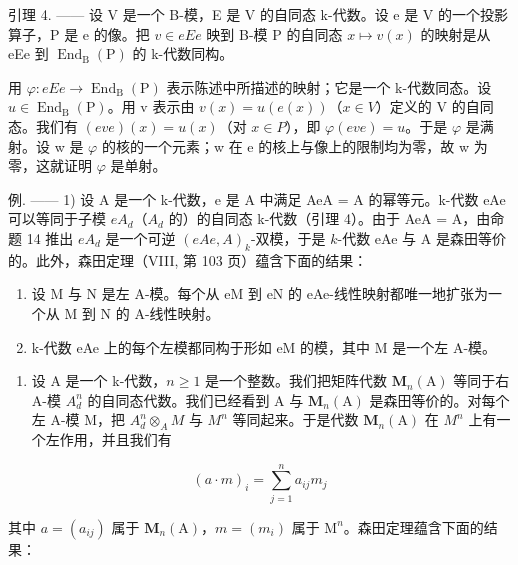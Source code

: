引理 4. —— 设 V 是一个 B-模，E 是 V 的自同态 k-代数。设 e 是 V 的一个投影算子，P 是 e 的像。把 \(v \in eEe\) 映到 B-模 P 的自同态 \(x \mapsto v(x)\) 的映射是从 eEe 到 \(\operatorname{End}_{\mathrm{B}}(\mathrm{P})\) 的 k-代数同构。

用 \(\varphi:eEe\to\operatorname{End}_{\mathrm{B}}(\mathrm{P})\) 表示陈述中所描述的映射；它是一个 k-代数同态。设 \(u\in\operatorname{End}_{\mathrm{B}}(\mathrm{P})\)。用 v 表示由 \(v(x)=u(e(x))\)（\(x\in V\)）定义的 V 的自同态。我们有 \((eve)(x)=u(x)\)（对 \(x\in P\)），即 \(\varphi(eve)=u\)。于是 \(\varphi\) 是满射。设 w 是 \(\varphi\) 的核的一个元素；w 在 e 的核上与像上的限制均为零，故 w 为零，这就证明 \(\varphi\) 是单射。

例. —— 1) 设 A 是一个 k-代数，e 是 A 中满足 AeA = A 的幂等元。k-代数 eAe 可以等同于子模 \(eA_{d}\)（\(A_{d}\) 的）的自同态 k-代数（引理 4）。由于 AeA = A，由命题 14 推出 \(eA_{d}\) 是一个可逆 \((eAe, A)_{k}\)-双模，于是 \(k\)-代数 eAe 与 A 是森田等价的。此外，森田定理（VIII, 第 103 页）蕴含下面的结果：

\begin{enumerate}
\def\labelenumi{\alph{enumi})}
\item
  设 M 与 N 是左 A-模。每个从 eM 到 eN 的 eAe-线性映射都唯一地扩张为一个从 M 到 N 的 A-线性映射。
\item
  k-代数 eAe 上的每个左模都同构于形如 eM 的模，其中 M 是一个左 A-模。
\end{enumerate}

\begin{enumerate}
\def\labelenumi{\arabic{enumi})}
\setcounter{enumi}{1}
\tightlist
\item
  设 A 是一个 k-代数，\(n \geqslant 1\) 是一个整数。我们把矩阵代数 \(\mathbf{M}_{n}(\mathrm{A})\) 等同于右 A-模 \(A_{d}^{n}\) 的自同态代数。我们已经看到 A 与 \(\mathbf{M}_{n}(\mathrm{A})\) 是森田等价的。对每个左 A-模 M，把 \(A_{d}^{n} \otimes_{A} M\) 与 \(M^{n}\) 等同起来。于是代数 \(\mathbf{M}_{n}(\mathrm{A})\) 在 \(M^{n}\) 上有一个左作用，并且我们有
\end{enumerate}

\[
(a \cdot m) _ {i} = \sum_ {j = 1} ^ {n} a _ {i j} m _ {j}
\]

其中 \(a = (a_{ij})\) 属于 \(\mathbf{M}_n(\mathrm{A})\)，\(m = (m_i)\) 属于 \(\mathrm{M}^n\)。森田定理蕴含下面的结果：

